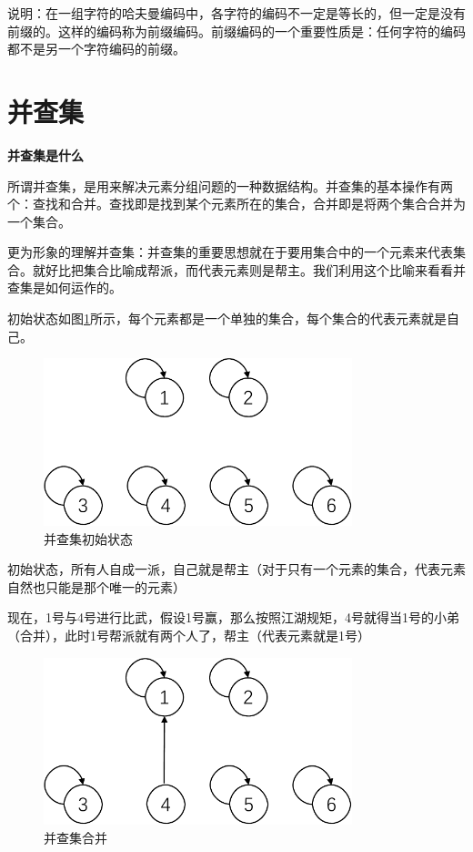 \documentclass[lang=cn,newtx,10pt,scheme=chinese]{../elegantbook}
\begin{document}
说明：在一组字符的哈夫曼编码中，各字符的编码不一定是等长的，但一定是没有前缀的。这样的编码称为前缀编码。前缀编码的一个重要性质是：任何字符的编码都不是另一个字符编码的前缀。
\section{并查集}

\textbf{并查集是什么}

所谓并查集，是用来解决元素分组问题的一种数据结构。并查集的基本操作有两个：查找和合并。查找即是找到某个元素所在的集合，合并即是将两个集合合并为一个集合。

更为形象的理解并查集：并查集的重要思想就在于要用集合中的一个元素来代表集合。就好比把集合比喻成帮派，而代表元素则是帮主。我们利用这个比喻来看看并查集是如何运作的。

初始状态如图\ref{fig:unionFind1}所示，每个元素都是一个单独的集合，每个集合的代表元素就是自己。

\begin{figure}[h!]
  \centering
  \includegraphics[width=0.8\textwidth]{./figure/pdf/cropped/unionFindExample(a).pdf}
  \caption{并查集初始状态}
  \label{fig:unionFind1}
\end{figure}

初始状态，所有人自成一派，自己就是帮主（对于只有一个元素的集合，代表元素自然也只能是那个唯一的元素）

现在，1号与4号进行比武，假设1号赢，那么按照江湖规矩，4号就得当1号的小弟（合并），此时1号帮派就有两个人了，帮主（代表元素就是1号）

\begin{figure}[h!]
  \centering
  \includegraphics[width=0.8\textwidth]{./figure/pdf/cropped/unionFindExample(b).pdf}
  \caption{并查集合并}
  \label{fig:unionFind2}
\end{figure}
\end{document}
